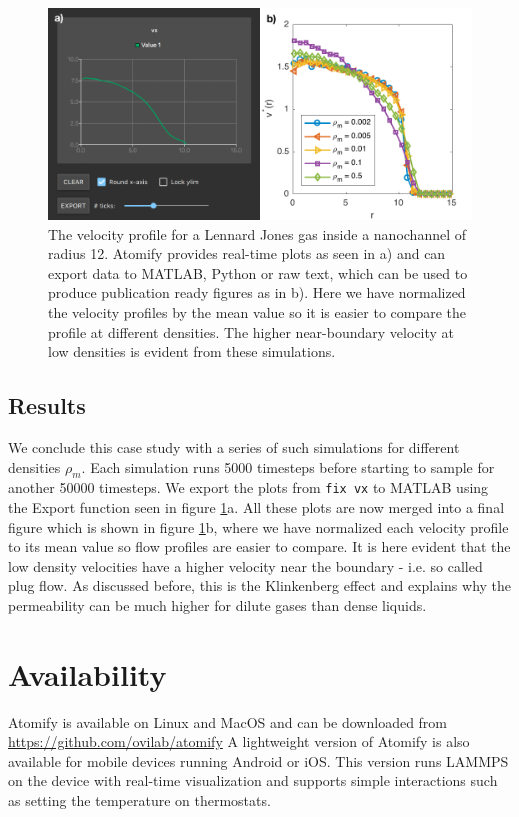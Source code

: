 \documentclass[12pt,a4paper,final]{iopart}
\newcommand{\code}[1]{\colorbox{light-gray}{\color{RawSienna}\texttt{#1}}}
\begin{document}
\begin{figure}
	\centering
	\includegraphics[width=\textwidth]{figures/velocity_profile.pdf}
	\caption{
		The velocity profile for a Lennard Jones gas inside a nanochannel of radius 12.
		Atomify provides real-time plots as seen in a) and can export data to MATLAB, Python
		or raw text, which can be used to produce publication ready figures as in b).
		Here we have normalized the velocity profiles by the mean value so it is easier
		to compare the profile at different densities. The higher near-boundary velocity at low densities
		is evident from these simulations.
    }
	\label{fig:velocity_profile1}
\end{figure}

\subsection{Results}
We conclude this case study with a series of such simulations for different densities $\rho_m$.
Each simulation runs 5000 timesteps before starting to sample for another 50000 timesteps.
We export the plots from \code{fix vx} to MATLAB using the Export function seen in figure \ref{fig:velocity_profile1}a.
All these plots are now merged into a final figure which is shown in figure \ref{fig:velocity_profile1}b, where
we have normalized each velocity profile to its mean value so flow profiles are easier to compare.
It is here evident that the low density velocities have a higher velocity near the boundary - i.e. so called plug flow.
As discussed before, this is the Klinkenberg effect and explains why the permeability can be much higher for dilute gases than dense liquids.

\section{Availability}
Atomify is available on Linux and MacOS and can be downloaded from
\url{https://github.com/ovilab/atomify}
A lightweight version of Atomify is also available for mobile devices running
Android or iOS. This version runs LAMMPS on the device with real-time visualization
and supports simple interactions such as setting the temperature on thermostats.
\end{document}
